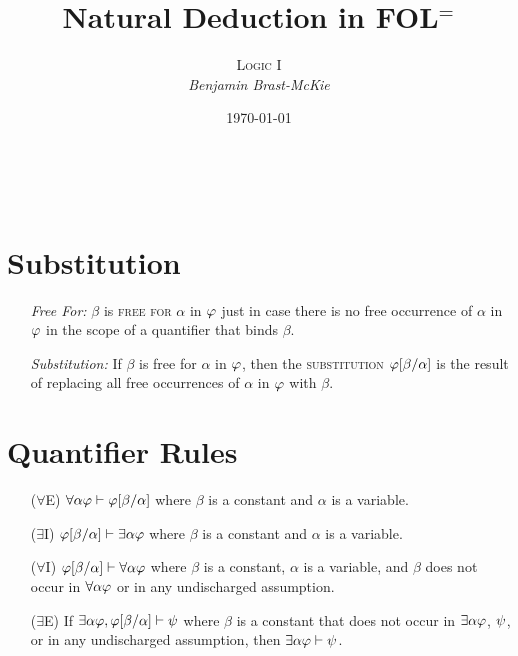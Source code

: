 \documentclass[a4paper, 11pt]{article} %
\title{\textbf{Natural Deduction in FOL$^=$}} %
\author{\textsc{Logic I}\\ \em Benjamin Brast-McKie} %
\date{\today} %
\makeatletter
\renewcommand{\maketitle}{
\begin{flushright}
{\LARGE\@title}

\vspace{10pt}

{\@author}
\\ \@date
\end{flushright}

\vspace{-10pt}

}
\makeatother
\begin{document}
\maketitle %

\thispagestyle{empty}



\section*{Substitution}

\begin{enumerate}
  \item[\it Free For:] $\beta$ is \textsc{free for} $\alpha$ in $\varphi$ just in case there is no free occurrence of $\alpha$ in $\varphi$ in the scope of a quantifier that binds $\beta$. 
  \item[\it Substitution:] If $\beta$ is free for $\alpha$ in $\varphi$, then the \textsc{substitution} $\varphi[\beta/\alpha]$ is the result of replacing all free occurrences of $\alpha$ in $\varphi$ with $\beta$.
\end{enumerate}
   


\section*{Quantifier Rules}

\begin{enumerate}
  \item[($\forall$E)] $\forall\alpha\varphi \vdash \varphi[\beta/\alpha]$ where $\beta$ is a constant and $\alpha$ is a variable. 
  \item[($\exists$I)] $\varphi[\beta/\alpha] \vdash \exists\alpha\varphi$ where $\beta$ is a constant and $\alpha$ is a variable.
  \item[($\forall$I)] $\varphi[\beta/\alpha] \vdash \forall\alpha\varphi$ where $\beta$ is a constant, $\alpha$ is a variable, and $\beta$ does not occur in $\forall\alpha\varphi$ or in any undischarged assumption.
  \item[($\exists$E)] If $\exists\alpha\varphi,\varphi[\beta/\alpha] \vdash \psi$ where $\beta$ is a constant that does not occur in $\exists\alpha\varphi$, $\psi$, or in any undischarged assumption, then $\exists\alpha\varphi\vdash \psi$.
\end{enumerate}
\end{document}
